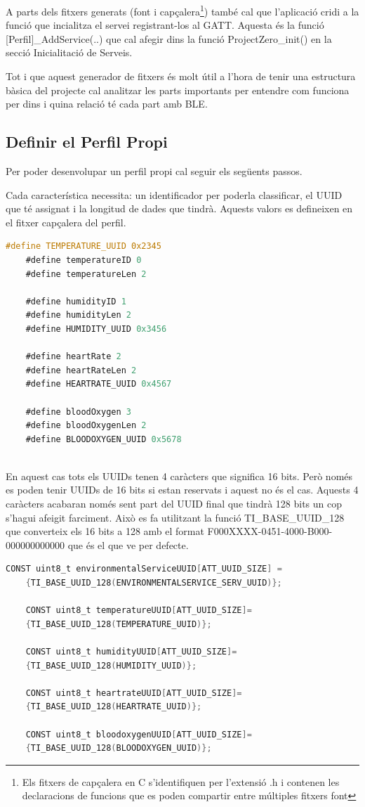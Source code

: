 A parts dels fitxers generats (font i capçalera\footnote{Els fitxers de capçalera en C s'identifiquen per l'extensió .h i contenen les declaracions de funcions que es poden compartir entre múltiples fitxers font}) també cal que l'aplicació cridi a la funció que incialitza el servei registrant-los al GATT.
Aquesta és la funció [Perfil]\_AddService(..) que cal afegir dins la funció ProjectZero\_init() en la secció Inicialitació de Serveis.

Tot i que aquest generador de fitxers és molt útil a l'hora de tenir una estructura bàsica del projecte cal analitzar les parts importants per entendre com funciona per dins i quina relació té cada part amb BLE.

\subsection{Definir el Perfil Propi}
Per poder desenvolupar un perfil propi cal seguir els següents passos.

Cada característica necessita: un identificador per poderla classificar, el UUID que té assignat i la longitud de dades que tindrà.
Aquests valors es defineixen en el fitxer capçalera del perfil.

\begin{lstlisting}[language=C]
	#define TEMPERATURE_UUID 0x2345
	#define temperatureID 0
	#define temperatureLen 2
	
	#define humidityID 1
	#define humidityLen 2
	#define HUMIDITY_UUID 0x3456
	
	#define heartRate 2
	#define heartRateLen 2
	#define HEARTRATE_UUID 0x4567
	
	#define bloodOxygen 3
	#define bloodOxygenLen 2
	#define BLOODOXYGEN_UUID 0x5678
	
\end{lstlisting}

En aquest cas tots els UUIDs tenen 4 caràcters que significa 16 bits. Però només es poden tenir UUIDs de 16 bits si estan reservats i aquest no és el cas.
Aquests 4 caràcters acabaran només sent part del UUID final que tindrà 128 bits un cop s'hagui afeigit farciment.
Això es fa utilitzant la funció TI\_BASE\_UUID\_128 que converteix els 16 bits a 128 amb el format F000XXXX-0451-4000-B000-000000000000 que és el que ve per defecte.

\begin{lstlisting}[language=C]
	CONST uint8_t environmentalServiceUUID[ATT_UUID_SIZE] =
	{TI_BASE_UUID_128(ENVIRONMENTALSERVICE_SERV_UUID)};
	
	CONST uint8_t temperatureUUID[ATT_UUID_SIZE]=
	{TI_BASE_UUID_128(TEMPERATURE_UUID)};
	
	CONST uint8_t humidityUUID[ATT_UUID_SIZE]=
	{TI_BASE_UUID_128(HUMIDITY_UUID)};
	
	CONST uint8_t heartrateUUID[ATT_UUID_SIZE]=
	{TI_BASE_UUID_128(HEARTRATE_UUID)};
	
	CONST uint8_t bloodoxygenUUID[ATT_UUID_SIZE]=
	{TI_BASE_UUID_128(BLOODOXYGEN_UUID)};
\end{lstlisting}

